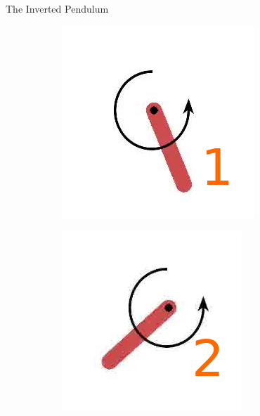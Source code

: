 \documentclass{beamer}
\begin{document}
\begin{frame}{The Inverted Pendulum}
\begin{figure}
\begin{subfigure}{0.2\linewidth}
    \end{subfigure}
    \begin{subfigure}{0.2\linewidth}
      \centering
      \includegraphics[width=\linewidth,trim=0 0 0 20]{assets/pendulum_traj_1}
    \end{subfigure}
    \begin{subfigure}{0.2\linewidth}
      \centering
      \includegraphics[width=\linewidth,trim=0 0 0 20]{assets/pendulum_traj_2}

\end{subfigure}
\end{figure}
\end{frame}
\end{document}

